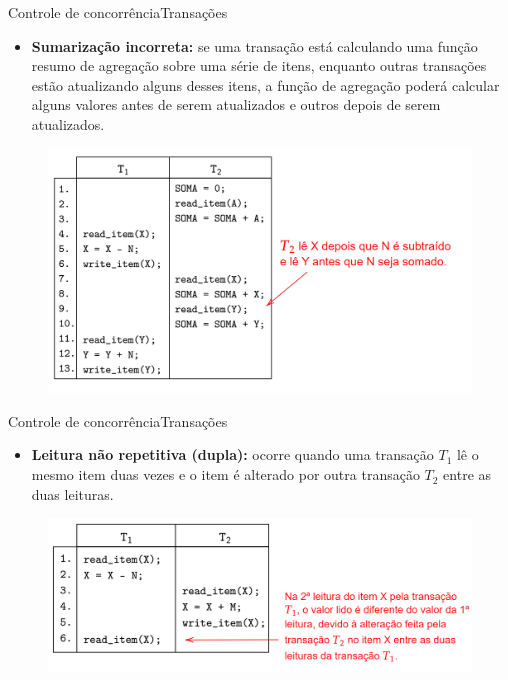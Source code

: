 \documentclass[t]{beamer}
\begin{document}

\begin{ftst}{Controle de concorrência}{Transações}
\small
\begin{itemize}
    \item \textbf{Sumarização incorreta:} se uma transação está calculando uma função resumo de agregação sobre uma série de itens, enquanto outras transações estão atualizando alguns desses itens, a função de agregação poderá calcular alguns valores antes de serem atualizados e outros depois de serem atualizados.
\end{itemize}
\begin{figure}
    \centering
    \includegraphics[scale=0.11]{Figuras_transacoes/9.png}
\end{figure}
\end{ftst}


\begin{ftst}{Controle de concorrência}{Transações}
\begin{itemize}
    \item \textbf{Leitura não repetitiva (dupla):} ocorre quando uma transação $T_1$ lê o mesmo item duas vezes e o item é alterado por outra transação $T_2$ entre as duas leituras.
\end{itemize}
\begin{figure}
    \centering
    \includegraphics[scale=0.15]{Figuras_transacoes/10.png}
\end{figure}
\end{ftst}
\end{document}
